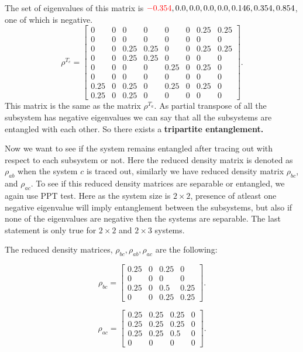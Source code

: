 \documentclass{amsart}
\theoremstyle{plain}
\theoremstyle{definition}
\theoremstyle{plain}
\begin{document}
 	The set of eigenvalues of this matrix is $\mathcolor{red}{-0.354}, 0.0, 0.0, 0.0, 0.0, 0.146, 0.354, 0.854$, one of which is negative. 
 	\begin{equation*}
 		\rho^{T_c} = \left[\begin{matrix}0 & 0 & 0 & 0 & 0 & 0 & 0.25 & 0.25\\0 & 0 & 0 & 0 & 0 & 0 & 0 & 0\\0 & 0 & 0.25 & 0.25 & 0 & 0 & 0.25 & 0.25\\0 & 0 & 0.25 & 0.25 & 0 & 0 & 0 & 0\\0 & 0 & 0 & 0 & 0.25 & 0 & 0.25 & 0\\0 & 0 & 0 & 0 & 0 & 0 & 0 & 0\\0.25 & 0 & 0.25 & 0 & 0.25 & 0 & 0.25 & 0\\0.25 & 0 & 0.25 & 0 & 0 & 0 & 0 & 0\end{matrix}\right].
 	\end{equation*}
	This matrix is the same as the matrix $\rho^{T_a}$. As partial transpose of all the subsystem has negative eigenvalues we can say that all the subsystems are entangled with each other. So there exists a \textbf{tripartite entanglement.}
	
	Now we want to see if the system remains entangled after tracing out with respect to each subsystem or not. Here the reduced density matrix is denoted as $\rho_{ab}$ when the system $c$ is traced out, similarly we have reduced density matrix $\rho_{bc}$, and $\rho_{ac}$. To see if this reduced density matrices are separable or entangled, we again use PPT test. Here as the system size is $2 \times 2$, presence of atleast one negative eigenvalue will imply entanglement between the subsystems, but also if none of the eigenvalues are negative then the systems are separable. The last statement is only true for $2 \times 2$ and $2 \times 3$ systems.
	
	The reduced density matrices, $ \rho_{bc},\rho_{ab}, \rho_{ac}$ are the following:
	
	\begin{equation*}
		\rho_{bc} = \left[\begin{matrix}0.25 & 0 & 0.25 & 0\\0 & 0 & 0 & 0\\0.25 & 0 & 0.5 & 0.25\\0 & 0 & 0.25 & 0.25\end{matrix}\right].
	\end{equation*}

	\begin{equation*}
		\rho_{ac} = \left[\begin{matrix}0.25 & 0.25 & 0.25 & 0\\0.25 & 0.25 & 0.25 & 0\\0.25 & 0.25 & 0.5 & 0\\0 & 0 & 0 & 0\end{matrix}\right].
	\end{equation*}
\end{document}
